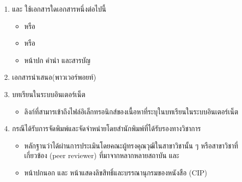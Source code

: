 \documentclass[a4paper,12pt,english]{sphinxmanual}
\begin{document}
\begin{enumerate}
%
\item {} 
{\hyperref[\detokenize{glossary:term-0}]{}} {\hyperref[\detokenize{glossary:term-1}]{}} {\hyperref[\detokenize{glossary:term-2}]{}} และ {\hyperref[\detokenize{glossary:term-3}]{}} ใช้เอกสารใดเอกสารหนึ่งต่อไปนี้
\begin{itemize}
\item {} 
{\hyperref[\detokenize{glossary:term-7}]{}}  หรือ

\item {} 
{\hyperref[\detokenize{glossary:term-8}]{}}  หรือ

\item {} 
หน้าปก คำนำ และสารบัญ

\end{itemize}

\item {} 
เอกสารนำเสนอ(พาวเวอร์พอยท์)

\item {} 
บทเรียนในระบบอินเตอร์เน็ต
\begin{itemize}
\item {} 
ลิงก์ที่สามารเข้าถึงไฟล์อิเล็กทรอนิกส์ของเนื้อหาที่ระบุในบทเรียนในระบบอินเตอร์เน็ต

\end{itemize}

\item {} 
{\hyperref[\detokenize{glossary:term-2}]{}} กรณีได้รับการจัดพิมพ์และจัดจำหน่ายโดยสำนักพิมพ์ที่ได้รับรองทางวิชาการ
\begin{itemize}
\item {} 
หลักฐานว่าได้ผ่านการประเมินโดยคณะผู้ทรงคุณวุฒิในสาขาวิชานั้น ๆ หรือสาขาวิชาที่เกี่ยวข้อง (peer reviewer) ที่มาจากหลากหลายสถาบัน และ

\item {} 
หน้าปกนอก และ หน้าแสดงลิขสิทธิ์และบรรณานุกรมของหนังสือ (CIP)

\end{itemize}

\end{enumerate}
\end{document}
